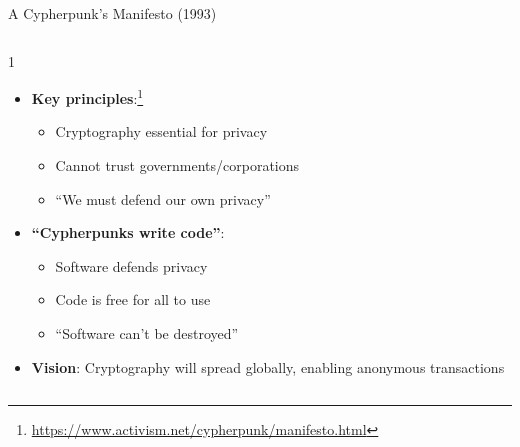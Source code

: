 \ifdefined\PRESENTATION\else\PassOptionsToClass{handout}{beamer}\fi\documentclass[aspectratio=169, lualatex]{beamer}
\begin{document}
\begin{frame}{A Cypherpunk's Manifesto (1993)}
	\begin{columns}[c]
		\begin{column}{1\textwidth}
			\begin{itemize}[<+->]
				\item \textbf{Key principles}:\footnote{\url{https://www.activism.net/cypherpunk/manifesto.html}}
				      \begin{itemize}
					      \item Cryptography essential for privacy
					      \item Cannot trust governments/corporations
					      \item ``We must defend our own privacy''
				      \end{itemize}
				\item \textbf{``Cypherpunks write code''}:
				      \begin{itemize}
					      \item Software defends privacy
					      \item Code is free for all to use
					      \item ``Software can't be destroyed''
				      \end{itemize}
				\item \textbf{Vision}: Cryptography will spread globally, enabling anonymous transactions
			\end{itemize}
		\end{column}
	\end{columns}
\end{frame}
\end{document}
